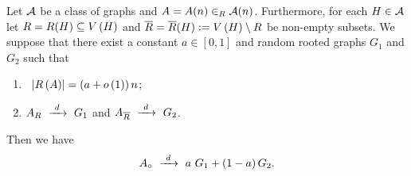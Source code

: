 \begin{lem}\label{LSlem:linear_combination}
Let $\mathcal{A}$ be a class of graphs and $A=A(n)\in_R\mathcal{A}(n)$. Furthermore, for each $H\in\mathcal{A}$ let $R=R(H)\subseteq V\left(H\right)$ and $\overline{R}=\overline{R}(H):=V\left(H\right)\setminus R$ be non-empty subsets. We suppose that there exist a constant $a \in [0,1]$ and random rooted graphs $G_1$ and $G_2$ such that \begin{enumerate}[label=\normalfont(\roman*)]
\item\label{LSass:1}
\whp\ $\left|R\left(A\right)\right|=\left(a+o\left(1\right)\right)n$;
\item\label{LSass:2}
$A_{R}~\xrightarrow{~d~}~G_1$ and $A_{\overline{R}}~\xrightarrow{~d~}~G_2$.
\end{enumerate}
Then we have
\begin{align*}
A_\circ~\xrightarrow{~d~}~a~G_1+\left(1-a\right)G_2.
\end{align*} 
\end{lem}
